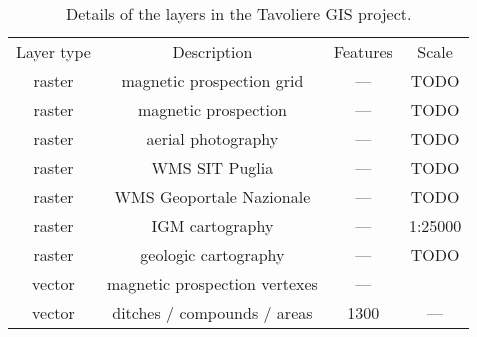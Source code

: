\begin{table}
    \centering
    \begin{tabular}{cccc}
        \toprule
        Layer type & Description          & Features & Scale \\
        \otoprule
        raster     & magnetic prospection grid & --- & TODO \\
        raster     & magnetic prospection & ---      & TODO \\
        raster     & aerial photography   & ---      & TODO \\
        raster     & WMS SIT Puglia       & ---      & TODO \\
        raster     & WMS Geoportale Nazionale & ---  & TODO \\
        raster     & IGM cartography      & ---      & 1:25000 \\
        raster     & geologic cartography & ---      & TODO \\
        vector     & magnetic prospection vertexes & --- \\
        vector     & ditches / compounds / areas & 1300   & --- \\
        \bottomrule
    \end{tabular}
    \caption[List of layers in Tavoliere neolithic GIS project]{Details of the layers in the Tavoliere GIS project.
    \label{tab:layers}
    }
\end{table}


